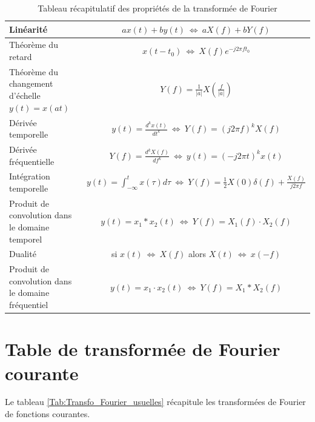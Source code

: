 	\begin{table}[h!]
		\centering
		\caption{\label{Tab:Propriétés_Transfo_Fourier} Tableau récapitulatif des propriétés de la transformée de Fourier}
		\begin{tabular}{|l|c|}
			\hline
			Linéarité & $ax(t)+by(t)~\Leftrightarrow~aX(f)+bY(f)$ \\	
			\hline
			Théorème du retard & $x(t-t_0)~\Leftrightarrow~X(f)e^{-j2\pi f t_0}$ \\	
			\hline
			Théorème du changement d'échelle $y(t)=x(at)$ & $Y(f)=\frac{1}{|a|}X(\frac{f}{|a|})$ \\	
			\hline
			Dérivée temporelle & $y(t)=\frac{d^{k}x(t)}{dt^{k}}~\Leftrightarrow~Y(f)=(j2\pi f)^{k}X(f)$ \\
			\hline
			Dérivée fréquentielle & $Y(f)=\frac{d^{k}X(f)}{df^{k}}~\Leftrightarrow~y(t)=(-j2\pi t)^{k}x(t)$ \\
			\hline
			Intégration temporelle & $y(t)=\int_{-\infty}^{t}x(\tau)d\tau~\Leftrightarrow~Y(f)=\frac{1}{2}X(0)\delta(f)+\frac{X(f)}{j2\pi f}$ \\
			\hline
			Produit de convolution dans le domaine temporel & $y(t)=x_1*x_2 (t)~\Leftrightarrow~Y(f)=X_1(f)\cdot X_2(f)$ \\
			\hline
			Dualité & si $x(t)~\Leftrightarrow~X(f)$ alors $ X(t)~\Leftrightarrow~x(-f)$ \\
			\hline
			Produit de convolution dans le domaine fréquentiel & $y(t)=x_1 \cdot x_2 (t)~\Leftrightarrow~Y(f)=X_1* X_2(f)$ \\
			\hline
		\end{tabular}	
	\end{table}
	
	\section{Table de transformée de Fourier courante}
	Le tableau \ref{Tab:Transfo_Fourier_usuelles} récapitule les transformées de Fourier de fonctions courantes.
	
